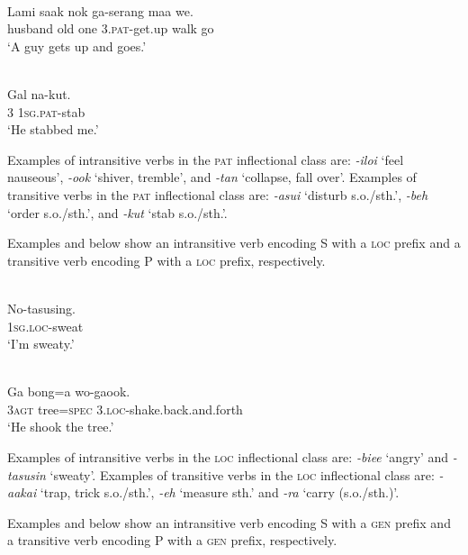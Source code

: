 \ea%
\label{bkm:Ref324337569}
 \\ 
\gll    Lami  saak  nok  ga-serang  maa  we.\\  
    husband  old  one  3.\textsc{pat}{}-get.up  walk  go  \\
\glt  `A guy gets up and goes.'
\z


\ea%
\label{bkm:Ref324338165}
 \\ 
\gll   Gal  na-kut.     \\  
   3  1\textsc{sg.pat}-stab     \\
\glt `He stabbed me.'
\z

Examples of intransitive verbs in the \textsc{pat} inflectional class are: \textit{-iloi} `feel nauseous', \textit{-ook} `shiver, tremble', and \textit{-tan} `collapse, fall over'. Examples of transitive verbs in the \textsc{pat} inflectional class are: \textit{-asui} `disturb s.o./sth.', \textit{-beh} `order s.o./sth.', and \textit{-kut} `stab s.o./sth.'.

Examples  and  below show an intransitive verb encoding S with a \textsc{loc} prefix and a transitive verb encoding P with a \textsc{loc} prefix, respectively.


\ea%
\label{bkm:Ref324338359}
 \\ 
\gll    No-tasusing.   \\  
    \textsc{1sg.loc}{}-sweat   \\
\glt  `I'm sweaty.'
\z


\ea 
\label{ex:10:1238}
 \\ 
 \gll    Ga  bong=a  wo-gaook.  \\
 \textsc{3agt} tree=\textsc{spec} 3.\textsc{loc}{}-shake.back.and.forth     \\
 \glt  `He shook the tree.'
\z



Examples of intransitive verbs in the \textsc{loc} inflectional class are: \textit{-biee} `angry' and \textit{-tasusin} `sweaty'. Examples of transitive verbs in the \textsc{loc} inflectional class are: \textit{-aakai} `trap, trick s.o./sth.', \textit{-eh} `measure sth.' and \textit{-ra} `carry (s.o./sth.)'.

Examples  and  below show an intransitive verb encoding S with a \textsc{gen} prefix and a transitive verb encoding P with a \textsc{gen} prefix, respectively.



